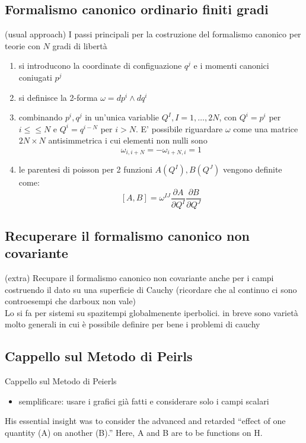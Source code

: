 \documentclass[Cascione]{subfiles}
\begin{document}
	\subsection{Formalismo canonico ordinario finiti gradi}
				(usual approach) I passi principali per la costruzione del formalismo canonico per teorie con $N$ gradi di libertà
						\begin{enumerate}
							\item si introducono la coordinate di configuazione $q^j$ e i momenti canonici coniugati $p^j$
							\item si definisce la 2-forma $\omega = dp^i \wedge dq^i$
							\item combinando $p^i,q^j$ in un'unica variablie $Q^I , I = 1,\ldots,2N$, con $Q^i=p^i$ per $i\leq\leq N$ e $Q^i= q^{i-N}$ per $i>N$. E' possibile riguardare $\omega$ come una matrice $2N \times N$  antisimmetrica i cui elementi non nulli sono
								\begin{displaymath}
									\omega_{i , i+N} = -\omega_{i+N,i} = 1
								\end{displaymath}
							\item le parentesi di poisson per 2 funzioni $A(Q^I) , B(Q^J)$ vengono definite come:
								\begin{displaymath}
									\left[ A , B \right] = \omega^{I J} \frac{\partial A}{\partial Q^I} \frac{\partial B}{\partial Q^J}					
								\end{displaymath}
						\end{enumerate}

	\subsection{Recuperare il formalismo canonico non covariante}
			(extra) Recupare il formalismo canonico non covariante anche per i campi costruendo il dato su una superficie di Cauchy (ricordare che al continuo ci sono controesempi che darboux non vale)
			\\
			Lo si fa per sistemi su spazitempi globalmenente iperbolici. in breve sono varietà molto generali in cui è possibile definire per bene i problemi di cauchy
			\\

\subsection{Cappello sul Metodo di Peirls}
{Cappello sul Metodo di Peierls }
			\begin{itemize}
				\item semplificare: usare i grafici già fatti e considerare solo i campi scalari
			\end{itemize}
			His essential insight was to consider the advanced and retarded “effect of one quantity (A) on another (B).” Here, A and B are to
be functions on H. 
\end{document}
